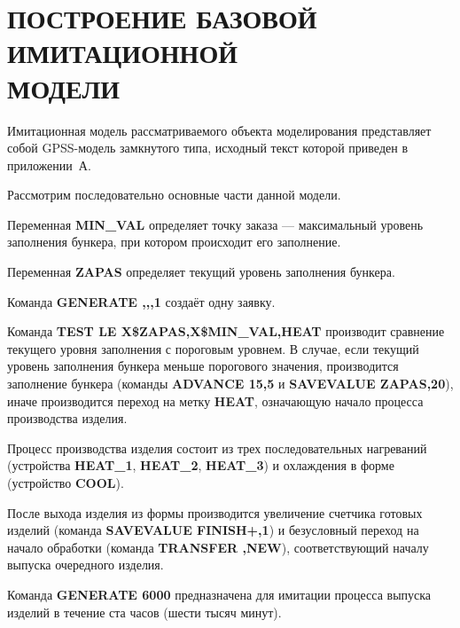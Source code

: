 \section[Построение базовой имитационной модели]{
  ПОСТРОЕНИЕ БАЗОВОЙ ИМИТАЦИОННОЙ \\ 
  МОДЕЛИ}

Имитационная модель рассматриваемого объекта моделирования
представляет собой GPSS-модель замкнутого типа, исходный текст которой приведен
в приложении~А.

Рассмотрим последовательно основные части данной модели.

Переменная \textbf{MIN\_VAL} определяет точку заказа --- 
максимальный уровень заполнения бункера, при котором происходит
его заполнение.

Переменная \textbf{ZAPAS} определяет текущий уровень заполнения бункера.

Команда \textbf{GENERATE ,,,1} создаёт одну заявку.

Команда \textbf{TEST LE X\$ZAPAS,X\$MIN\_VAL,HEAT} производит сравнение
текущего уровня заполнения с пороговым уровнем. 
В случае, если текущий уровень заполнения бункера меньше порогового значения,
производится заполнение бункера 
(команды \textbf{ADVANCE 15,5} и \textbf{SAVEVALUE ZAPAS,20}),
иначе производится переход на метку \textbf{HEAT},
означающую начало процесса производства изделия.

Процесс производства изделия состоит из трех последовательных нагреваний
(устройства \textbf{HEAT\_1}, \textbf{HEAT\_2}, \textbf{HEAT\_3}) и
охлаждения в форме (устройство \textbf{COOL}).

После выхода изделия из формы производится увеличение счетчика готовых изделий
(команда \textbf{SAVEVALUE FINISH+,1}) и безусловный переход на начало обработки
(команда \textbf{TRANSFER ,NEW}), соответствующий началу выпуска очередного
изделия.

Команда \textbf{GENERATE 6000} предназначена для имитации процесса выпуска 
изделий в течение ста часов (шести тысяч минут).
